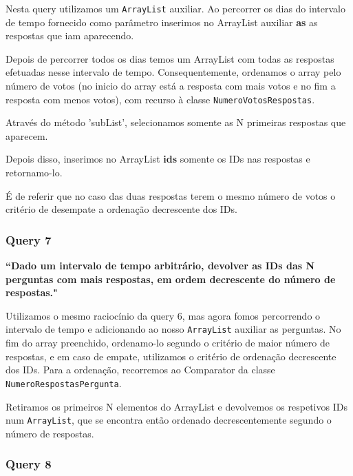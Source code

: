 \documentclass[a4paper]{article}
\begin{document}
\vspace{0.1cm}

Nesta query utilizamos um \texttt{ArrayList} auxiliar. Ao percorrer os
dias do intervalo de tempo fornecido como parâmetro inserimos
no ArrayList auxiliar \textbf{as} as
respostas que iam aparecendo.

Depois de percorrer todos os dias temos um ArrayList com todas as respostas
efetuadas nesse intervalo de tempo. Consequentemente, ordenamos o array pelo número
de votos (no inicio do array está a resposta com mais votos e no fim a resposta
com menos votos), com recurso à classe \texttt{NumeroVotosRespostas}.

Através do método 'subList', selecionamos somente as N primeiras respostas
que aparecem.

Depois disso, inserimos no ArrayList \textbf{ids} somente os
IDs nas respostas e retornamo-lo.

É de referir que no caso das duas respostas terem o mesmo número
de votos o critério de desempate a ordenação decrescente dos IDs.



\subsubsection*{Query 7}
\label{sec:query7}

\textbf{“Dado um intervalo de tempo arbitrário, devolver as IDs das N perguntas
com mais respostas, em ordem decrescente do número de respostas."}

\vspace{0.1cm}

Utilizamos o mesmo raciocínio da query 6, mas agora fomos percorrendo o intervalo
de tempo e adicionando ao nosso \texttt{ArrayList} auxiliar as perguntas.
No fim do array preenchido, ordenamo-lo segundo o critério de maior número
de respostas, e em caso de empate, utilizamos o critério de ordenação decrescente dos IDs.
Para a ordenação, recorremos ao Comparator da classe \texttt{NumeroRespostasPergunta}.

Retiramos os primeiros N elementos do ArrayList e devolvemos os respetivos IDs
num \texttt{ArrayList}, que se encontra então ordenado
decrescentemente segundo o número de respostas.



\subsubsection*{Query 8}
\label{sec:query8}
\end{document}
